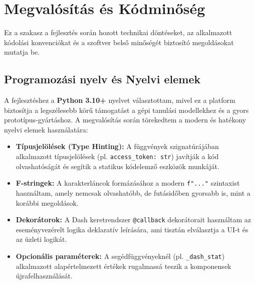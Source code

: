 \documentclass[
	parspace, %
]{elteikthesis}[2024/04/26]
\begin{document}
\section{Megvalósítás és Kódminőség}
\label{sec:implementation-details}
Ez a szakasz a fejlesztés során hozott technikai döntéseket, az alkalmazott kódolási konvenciókat és a szoftver belső minőségét biztosító megoldásokat mutatja be.

\subsection{Programozási nyelv és Nyelvi elemek}
A fejlesztéshez a \textbf{Python 3.10+} nyelvet választottam, mivel ez a platform biztosítja a legszélesebb körű támogatást a gépi tanulási modellekhez és a gyors prototípus-gyártáshoz. A megvalósítás során törekedtem a modern és hatékony nyelvi elemek használatára:
\begin{itemize}
    \item \textbf{Típusjelölések (Type Hinting):} A függvények szignatúrájában alkalmazott típusjelölések (pl. \texttt{access\_token: str}) javítják a kód olvashatóságát és segítik a statikus kódelemző eszközök munkáját.
    \item \textbf{F-stringek:} A karakterláncok formázásához a modern \texttt{f"..."} szintaxist használtam, amely nemcsak olvashatóbb, de futásidőben gyorsabb is, mint a korábbi megoldások.
    \item \textbf{Dekorátorok:} A Dash keretrendszer \texttt{@callback} dekorátorait használtam az eseményvezérelt logika deklaratív leírására, ami tisztán elválasztja a UI-t és az üzleti logikát.
    \item \textbf{Opcionális paraméterek:} A segédfüggvényeknél (pl. \texttt{\_dash\_stat}) alkalmazott alapértelmezett értékek rugalmassá teszik a komponensek újrafelhasználását.
\end{itemize}
\end{document}
